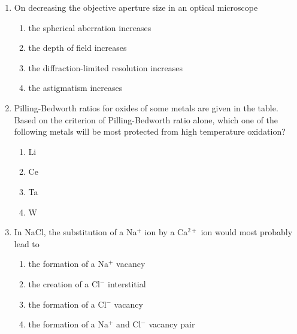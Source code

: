 \documentclass[journal,12pt,onecolumn]{IEEEtran}
\begin{document}
\begin{enumerate}[label=\arabic*)]

\item On decreasing the objective aperture size in an optical microscope
\hfill{} \\

\vspace{0.2cm}
\begin{enumerate}[label=\alph*)]
\item the spherical aberration increases
\item the depth of field increases
\item the diffraction-limited resolution increases
\item the astigmatism increases
\end{enumerate}

\vspace{0.5cm}

\item Pilling-Bedworth ratios for oxides of some metals are given in the table.\\



Based on the criterion of Pilling-Bedworth ratio alone, which one of the following metals will be most protected from high temperature oxidation?
\hfill{} \\

\vspace{0.2cm}
\begin{enumerate}[label=\alph*)]
\item Li
\item Ce
\item Ta
\item W
\end{enumerate}

\vspace{0.5cm}

\item In NaCl, the substitution of a Na$^+$ ion by a Ca$^{2+}$ ion would most probably lead to
\hfill{} \\

\vspace{0.2cm}
\begin{enumerate}[label=\alph*)]
\item the formation of a Na$^+$ vacancy
\item the creation of a Cl$^-$ interstitial
\item the formation of a Cl$^-$ vacancy
\item the formation of a Na$^+$ and Cl$^-$ vacancy pair
\end{enumerate}


\end{enumerate}
\end{document}
